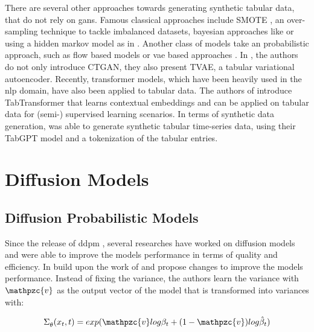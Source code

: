 There are several other approaches towards generating synthetic tabular data, that do not rely on \glspl{gan}.
Famous classical approaches include SMOTE \cite{chawla2002SMOTESyntheticMinority}, an over-sampling technique to tackle imbalanced datasets, bayesian approaches like \cite{zhang2017PrivBayesPrivateData} or using a hidden markov model  as in \cite{dahmen2019SynSysSyntheticData}.
Another class of models take an probabilistic approach, such as flow based models \cite{kamthe2021CopulaFlowsSynthetic} or \gls{vae} based approaches \cite{kingma2013AutoEncodingVariationalBayes}.
In \cite{xu2019ModelingTabularData}, the authors do not only introduce CTGAN, they also present TVAE, a tabular variational autoencoder.
Recently, transformer models, which have been heavily used in the \gls{nlp} domain, have also been applied to tabular data.
The authors of \cite{huang2020TabTransformerTabularData} introduce TabTransformer that learns contextual embeddings and can be applied on tabular data for (semi-) supervised learning scenarios.
In terms of synthetic data generation, \cite{padhi2021TabularTransformersModeling} was able to generate synthetic tabular time-series data, using their TabGPT model and a tokenization of the tabular entries.



\section{Diffusion Models}
\label{ch:relatedWork-diffusionModels}

\subsection{Diffusion Probabilistic Models}
\label{ch:preliminaries-diffusionProbabilisticModelsTabularData}

Since the release of \gls{ddpm} \cite{ho2020DenoisingDiffusionProbabilistic}, several researches have worked on diffusion models and were able to improve the models performance in terms of quality and efficiency.
In \cite{nichol2021ImprovedDenoisingDiffusion} build upon the work of \cite{ho2020DenoisingDiffusionProbabilistic} and propose changes to improve the models performance.
Instead of fixing the variance, the authors learn the variance with $\mathpzc{v}$ as the output vector of the model that is transformed into variances with:

\begin{equation}
    \label{eqn:impr_diff}
    \begin{align*}
        \Sigma_{\theta}^{}(x_t,t)=exp(\mathpzc{v}log\beta_t+(1-\mathpzc{v})log\hat{\beta}_t)
    \end{align*}
\end{equation}

